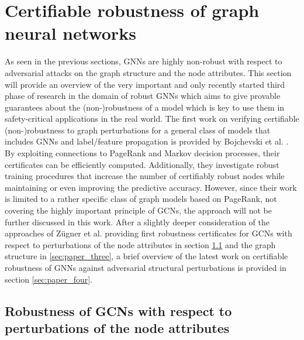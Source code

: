\documentclass[a4paper,preprint]{sig-alternate}
\begin{document}
\section{Certifiable robustness of graph neural networks}
\label{sec:main_section}

As seen in the previous sections, GNNs are highly non-robust with respect to adversarial attacks on the graph
structure and the node attributes. This section will provide an overview of the very important and only recently started 
third phase of research in the domain of robust GNNs which aims to give provable guarantees about the (non-)robustness of a model 
which is key to use them in safety-critical applications in the real world.\newline
The first work on verifying certifiable (non-)robustness to graph perturbations for a general class of models that includes GNNs and label/feature
propagation is provided by Bojchevski et al. \cite{bojchevski2019certifiable}. By exploiting connections to PageRank and Markov decision processes,
their certificates can be efficiently computed. Additionally, they investigate robust training procedures that increase the number of certifiably
robust nodes while maintaining or even improving the predictive accuracy. However, since their work is limited to a rather specific class of 
graph models based on PageRank, not covering the highly important principle of GCNs, the approach will not be further discussed in this work.\newline
After a slightly deeper consideration of the approaches of Zügner et al. providing first robustness certificates for GCNs with respect to 
perturbations of the node attributes in section \ref{sec:paper_two} and the graph structure in \ref{sec:paper_three},
a brief overview of the latest work on certifiable robustness of GNNs against adversarial structural perturbations is provided 
in section \ref{sec:paper_four}.\newline

\subsection{Robustness of GCNs with respect to perturbations of the node attributes}
\label{sec:paper_two}
\end{document}
